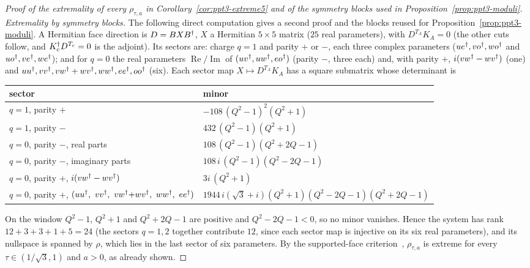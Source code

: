 \begin{proof}[Proof of the extremality of every $\rho_{\tau,a}$ in Corollary~\ref{cor:ppt3-extreme5} and of the symmetry blocks used in Proposition~\ref{prop:ppt3-moduli}]
\emph{Extremality by symmetry blocks.} The following direct computation gives a second proof and the blocks reused for Proposition~\ref{prop:ppt3-moduli}.
A Hermitian face direction is $D=BXB^{\dagger}$, $X$ a Hermitian $5\times5$ matrix ($25$ real parameters), with $D^{T_A}K_A=0$ (the
other cuts follow, and $K_c^{\dagger} D^{T_c}=0$ is the adjoint). Its sectors are:
charge $q=1$ and parity $+$ or $-$, each three complex parameters ($ue^{\dagger},vo^{\dagger},wo^{\dagger}$ and $uo^{\dagger},ve^{\dagger},we^{\dagger}$); and for $q=0$ the real parameters
$\operatorname{Re}/\operatorname{Im}$ of $(uv^{\dagger},uw^{\dagger},eo^{\dagger})$ (parity $-$, three each) and, with parity $+$, $i(vw^{\dagger}-wv^{\dagger})$ (one) and
$uu^{\dagger},vv^{\dagger},vw^{\dagger}+wv^{\dagger},ww^{\dagger},ee^{\dagger},oo^{\dagger}$ (six). Each sector map $X\mapsto D^{T_A}K_A$ has a square submatrix whose determinant is
\begin{center}\small
\begin{tabular}{@{}ll@{}}\toprule
sector & minor \\\midrule
$q=1$, parity $+$ & $-108\,(Q^2-1)^2(Q^2+1)$ \\
$q=1$, parity $-$ & $432\,(Q^2-1)(Q^2+1)$ \\
$q=0$, parity $-$, real parts & $108\,(Q^2-1)(Q^2+2Q-1)$ \\
$q=0$, parity $-$, imaginary parts & $108\,i\,(Q^2-1)(Q^2-2Q-1)$ \\
$q=0$, parity $+$, $i(vw^{\dagger}-wv^{\dagger})$ & $3i\,(Q^2+1)$ \\
$q=0$, parity $+$, $(uu\dg,\ vv\dg,\ vw\dg{+}wv\dg,\ ww\dg,\ ee\dg)$ & $1944\,i(\sqrt3+i)(Q^2+1)(Q^2-2Q-1)(Q^2+2Q-1)$ \\\bottomrule
\end{tabular}
\end{center}
On the window $Q^2-1$, $Q^2+1$ and $Q^2+2Q-1$ are positive and $Q^2-2Q-1<0$, so no minor vanishes. Hence the system has rank
$12+3+3+1+5=24$ (the sectors $q=1,2$ together contribute $12$, since each sector map is injective on its six real parameters), and its nullspace is spanned by $\rho$,
which lies in the last sector of six parameters. By the
supported-face criterion~\cite{GIM}, $\rho_{\tau,a}$ is extreme for every $\tau\in(1/\sqrt3,1)$ and $a>0$, as already shown.


\end{proof}
